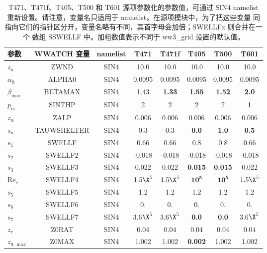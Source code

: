 \begin{landscape}
\begin{table}
\begin{center}
\begin{tabular}{|l|c|c|c|c|c|c|c|} \hline \hline
参数         &  WWATCH 变量       & namelist & T471    & T471f       & T405          & T500         & T601     \\
\hline
  $z_u$ &  ZWND                       & SIN4 & 10.0    & 10.0        & 10.0          & 10.0         & 10.0        \\
  $\alpha_0$ &  ALPHA0                & SIN4 & 0.0095  & 0.0095      & 0.0095        &  0.0095      & 0.0095      \\
  $\beta_{\mathrm{max}}$ & BETAMAX    & SIN4 & 1.43    &\textbf{1.33}& \textbf{1.55} &\textbf{1.52} & \textbf{2.0}\\
  $p_{\mathrm{in}}$ &  SINTHP         & SIN4 & 2       & 2           & 2             &  2           & \textbf{1}  \\
  $z_\alpha$ &  ZALP                  & SIN4 & 0.006   & 0.006       & 0.006         &0.006         & 0.006       \\
  $s_u$ &  TAUWSHELTER                & SIN4 & 0.3     & 0.3         & \textbf{0.0}  &\textbf{1.0}  & \textbf{0.5}\\
  $s_1$ &  SWELLF                     & SIN4 & 0.66    & 0.66        & 0.8           &  0.8         & 0.66        \\
  $s_2$ &  SWELLF2                    & SIN4 & -0.018  & -0.018      & -0.018        &  -0.018      &  -0.018     \\
  $s_3$ &  SWELLF3                    & SIN4 &  0.022  &  0.022      &\textbf{0.015} &\textbf{0.015}&  0.022      \\
  $\mathrm{Re}_c$ &  SWELLF4          & SIN4 &$1.5\X^5$& $1.5\X^5$   &$\mathbf{10^5}$&$\mathbf{10^5}$&  $1.5\X^5$ \\
  $s_5$ &  SWELLF5                    & SIN4 & 1.2     & 1.2         & 1.2           &  1.2         & 1.2         \\
  $s_6$ &  SWELLF6                    & SIN4 & 0.      & 0.          & 0.            & 0.           & 0.          \\
  $s_7$ &  SWELLF7                    & SIN4 &3.6$\X^5$&3.6$\X^5$    &\textbf{0.0}   &\textbf{0.0}  & 3.6$\X^5$   \\
  $z_r$ &  Z0RAT                      & SIN4 & 0.04    & 0.04        & 0.04          &  0.04        &   0.04      \\
  $z_{0,\max}$ &  Z0MAX               & SIN4 & 1.002   & 1.002       &\textbf{0.002} &  1.002       &  1.002      \\
\hline
\end{tabular}
\end{center}
\caption{T471、T471f、T405、T500 和 T601 源项参数化的参数值，可通过 {\F SIN4}
namelist 重新设置。请注意，变量名只适用于 namelist。在源项模块中，为了把这些变量
同指向它们的指针区分开，变量名略有不同，其首字母会加倍；SWELLFx 则合并在一个
数组 SSWELLF 中。加粗数值表示不同于 ww3\_grid 设置的默认值。} \label{tab:ST4_parSIN}
\end{table}
\end{landscape}

